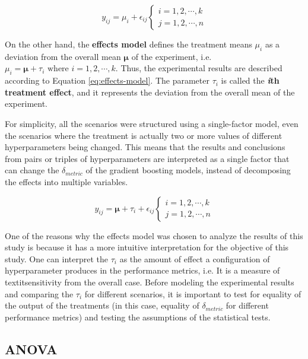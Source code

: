 \begin{equation}\label{eq:means-model}
    y_{ij} = \mu_i + \epsilon_{ij}
    \begin{cases}
        i = 1, 2, \cdots , k\\
        j = 1, 2, \cdots, n
    \end{cases}
\end{equation}

On the other hand, the \textbf{effects model} defines the treatment means $\mu_i$ as a deviation from the overall mean $\bm{\mu}$ of the experiment, i.e. $\mu_i = \bm{\mu}+ \tau_i \text{ where } i = 1, 2, \cdots, k$. Thus, the experimental results are described according to Equation \ref{eq:effects-model}. The parameter $\tau_i$ is called the \textbf{\textit{i}th treatment effect}, and it represents the deviation from the overall mean of the experiment.

For simplicity, all the scenarios were structured using a single-factor model, even the scenarios where the treatment is actually two or more values of different hyperparameters being changed. This means that the results and conclusions from pairs or triples of hyperparameters are interpreted as a single factor that can change the $\delta_{metric}$ of the gradient boosting models, instead of decomposing the effects into multiple variables.

\begin{equation}\label{eq:effects-model}
    y_{ij} = \bm{\mu} + \tau_i + \epsilon_{ij}
    \begin{cases}
        i = 1, 2, \cdots , k\\
        j = 1, 2, \cdots, n
    \end{cases}
\end{equation}

One of the reasons why the effects model was chosen to analyze the results of this study is because it has a more intuitive interpretation for the objective of this study. One can interpret the $\tau_i$ as the amount of effect a configuration of hyperparameter produces in the performance metrics, i.e. It is a measure of textit{sensitivity} from the overall case. Before modeling the experimental results and comparing the $\tau_i$ for different scenarios, it is important to test for equality of the output of the treatments (in this case, equality of $\delta_{metric}$ for different performance metrics) and testing the assumptions of the statistical tests.

\subsection{ANOVA}

